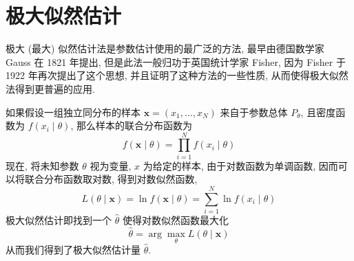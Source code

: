 

\section{极大似然估计}

极大 (最大) 似然估计法是参数估计使用的最广泛的方法, 最早由德国数学家 Gauss 在 1821 年提出,
但是此法一般归功于英国统计学家 Fisher, 因为 Fisher 于 1922 年再次提出了这个思想, 并且证明了这种方法的一些性质,
从而使得极大似然法得到更普遍的应用.

如果假设一组独立同分布的样本 $ \boldsymbol{x}=\left(x_{1}, \ldots, x_{N}\right) $ 来自于参数总体 $ P_{\theta} $, 且密度函数为 $ f\left(x_{i} \mid \theta\right) $, 那么样本的联合分布函数为
$$
f(\boldsymbol{x} \mid \theta)=\prod_{i=1}^{N} f\left(x_{i} \mid \theta\right)
$$
现在, 将未知参数 $ \theta $ 视为变量, $ x $ 为给定的样本, 由于对数函数为单调函数, 因而可以将联合分布函数取对数, 得到对数似然函数,
$$
L(\theta \mid \boldsymbol{x})=\ln f(\boldsymbol{x} \mid \theta)=\sum_{i=1}^{N} \ln f\left(x_{i} \mid \theta\right)
$$
极大似然估计即找到一个 $ \hat{\theta} $ 使得对数似然函数最大化
$$
\hat{\theta}=\arg \max _{\theta} L(\theta \mid \boldsymbol{x})
$$
从而我们得到了极大似然估计量 $ \hat{\theta} $.

